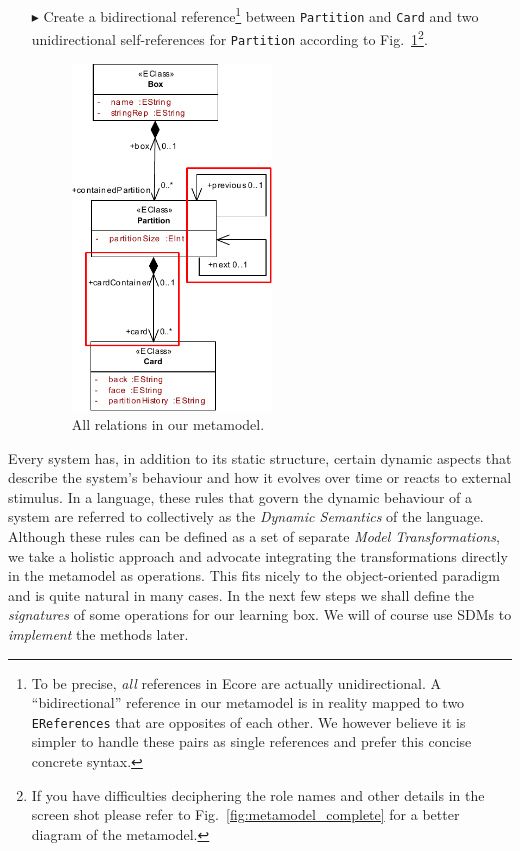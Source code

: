 \begin{enumerate}
\item[$\blacktriangleright$] Create a bidirectional reference\footnote{To be precise, \emph{all} references in Ecore are actually unidirectional.
A ``bidirectional'' reference in our metamodel is in reality mapped to two \texttt{EReferences} that are opposites of each other.
We however believe it is simpler to handle these pairs as single references and prefer this concise concrete syntax.} between \texttt{Partition} and \texttt{Card} and two unidirectional self-references for \texttt{Partition} according to Fig.~\ref{fig:ereferences_all}\footnote{If you have difficulties deciphering the role names and other details in the screen shot please refer to Fig.~\ref{fig:metamodel_complete} for a better diagram of the metamodel.}.

\begin{figure}[htbp]
	\centering
  \includegraphics[width=0.5\textwidth]{pics/memBoxBilder/memBox34.pdf}
	\caption{All relations in our metamodel.}
	\label{fig:ereferences_all}
\end{figure}
\end{enumerate}

Every system has, in addition to its static structure, certain dynamic aspects that describe the system's behaviour and how it evolves over time or reacts to external stimulus.
In a language, these rules that govern the dynamic behaviour of a system are referred to collectively as the \emph{Dynamic Semantics} of the language.
Although these rules can be defined as a set of separate \emph{Model Transformations}, we take a holistic approach and advocate integrating the transformations directly in the metamodel as operations.
This fits nicely to the object-oriented paradigm and is quite natural in many cases.
In the next few steps we shall define the \emph{signatures} of some operations for our learning box.
We will of course use SDMs to \emph{implement} the methods later.

